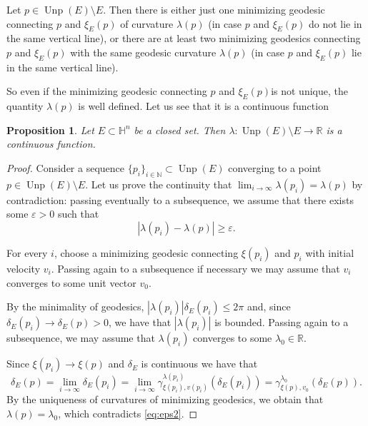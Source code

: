 \documentclass[10pt]{amsart}
\newtheorem{proposition}[theorem]{Proposition}
\theoremstyle{definition}
\theoremstyle{remark}
\numberwithin{equation}{section}
\begin{document}
Let $p\in\operatorname{Unp}(E)\setminus E$.  Then there is either just one minimizing geodesic connecting $p$ and $\xi_E(p)$ of curvature ${\lambda}(p)$ (in case $p$ and $\xi_E(p)$ do not lie in the same vertical line), or there are at least two minimizing geodesics connecting $p$ and $\xi_E(p)$ with the same geodesic curvature ${\lambda}(p)$ (in case $p$ and $\xi_E(p)$ lie in the same vertical line). 

So even if the minimizing geodesic connecting $p$ and $\xi_E(p)$is not unique, the quantity ${\lambda}(p)$ is well defined. Let us see that it is a continuous function

\begin{proposition}
\label{prop:lacont}
Let $E\subset{{\mathbb{H}}}^n$ be a closed set.  Then ${\lambda}:\operatorname{Unp}(E)\setminus E\to{{\mathbb{R}}}$ is a continuous function.
\end{proposition}

\begin{proof}
Consider a sequence $\{p_{i}\}_{i\in{{\mathbb{N}}}}\subset\operatorname{Unp}(E)$ converging to a point $p\in\operatorname{Unp}(E)\setminus E$. Let us prove the continuity that $\lim_{i\to\infty}{\lambda}(p_i)={\lambda}(p)$ by contradiction: passing eventually to a subsequence, we assume that there exists some ${\varepsilon}>0$ such that
\begin{equation}
\label{eq:eps2}
|{\lambda}(p_{i})-{\lambda}(p)|{\geqslant}{\varepsilon}.
\end{equation}

For every $i$, choose a minimizing geodesic connecting $\xi(p_i)$ and $p_i$ with initial velocity $v_i$. Passing again to a subsequence if necessary we may assume that $v_i$ converges to some unit vector $v_0$.

By the minimality of geodesics, $|{\lambda}(p_{i})|\delta_{E}(p_{i}){\leqslant} 2\pi$ and, since $\delta_{E}(p_{i})\to\delta_{E}(p)>0$, we have that $|{\lambda}(p_{i})|$ is bounded. Passing again to a subsequence, we may assume that ${\lambda}(p_{i})$ converges to some ${\lambda}_0\in{{\mathbb{R}}}$.

Since
$\xi(p_{i})\to\xi(p)$ and $\delta_{E}$ is continuous we have that
\[
\delta_{E}(p)=\lim_{i\to\infty}\delta_{E}(p_{i})=
\lim_{i\to\infty}{\gamma}_{\xi(p_{i}),v(p_{i})}^{{\lambda}(p_{i})}(\delta_{E}(p_{i}))=
{\gamma}_{\xi(p),v_0}^{{\lambda}_0}(\delta_{E}(p)).
\]
By the uniqueness of curvatures of minimizing geodesics, we
obtain that ${\lambda}(p)={\lambda}_{0}$, which contradicts \eqref{eq:eps2}.
\end{proof}
\end{document}
